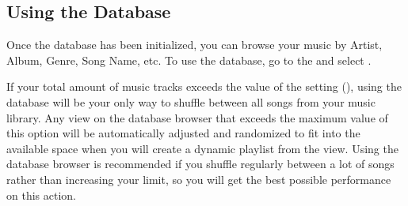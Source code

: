 \subsection{Using the Database}
Once the database has been initialized, you can browse your music 
by Artist, Album, Genre, Song Name, etc.  To use the database, go to the
  and select .\\

%

If your total amount of music tracks exceeds the value of the
 setting (), using the database
will be your only way to shuffle between all songs from your music library.
Any view on the database browser that exceeds the maximum value of this option
will be automatically adjusted and randomized to fit into the available space
when you will create a dynamic playlist from the view.
Using the database browser is recommended if you shuffle regularly between a lot of
songs rather than increasing your limit, so you will get the best possible performance
on this action.


